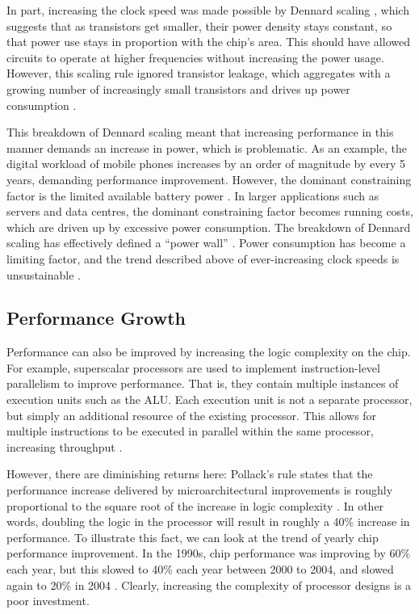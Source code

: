 \documentclass[bsc,frontabs,twoside,singlespacing,parskip,deptreport]{infthesis}     %
\begin{document}
In part, increasing the clock speed was made possible by Dennard scaling \cite{dennard_1999}, which suggests that as transistors get smaller, their power density stays constant, so that power use stays in proportion with the chip's area. This should have allowed circuits to operate at higher frequencies without increasing the power usage. However, this scaling rule ignored transistor leakage, which aggregates with a growing number of increasingly small transistors and drives up power consumption \cite{bohr_2007}.

This breakdown of Dennard scaling meant that increasing performance in this manner demands an increase in power, which is problematic. As an example, the digital workload of mobile phones increases by an order of magnitude by every 5 years, demanding performance improvement. However, the dominant constraining factor is the limited available battery power \cite{berkel_2009}. In larger applications such as servers and data centres, the dominant constraining factor becomes running costs, which are driven up by excessive power consumption. The breakdown of Dennard scaling has effectively defined a “power wall” \cite{patterson-hennessy}. Power consumption has become a limiting factor, and the trend described above of ever-increasing clock speeds is unsustainable \cite{blake_2009}.

\subsection{Performance Growth} \label{performance-growth}
Performance can also be improved by increasing the logic complexity on the chip. For example, superscalar processors are used to implement instruction-level parallelism to improve performance. That is, they contain multiple instances of execution units such as the ALU. Each execution unit is not a separate processor, but simply an additional resource of the existing processor. This allows for multiple instructions to be executed in parallel within the same processor, increasing throughput \cite{stallings}.

However, there are diminishing returns here: Pollack’s rule states that the performance increase delivered by microarchitectural improvements is roughly proportional to the square root of the increase in logic complexity \cite{borkar_2007}. In other words, doubling the logic in the processor will result in roughly a 40\% increase in performance. To illustrate this fact, we can look at the trend of yearly chip performance improvement. In the 1990s, chip performance was improving by 60\% each year, but this slowed to 40\% each year between 2000 to 2004, and slowed again to 20\% in 2004 \cite{geer_2005}. Clearly, increasing the complexity of processor designs is a poor investment.
\end{document}
